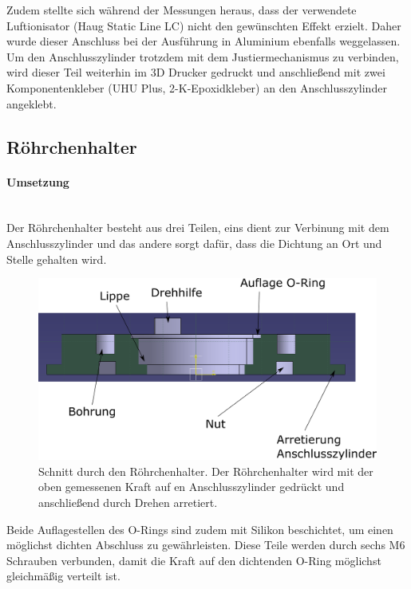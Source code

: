 Zudem stellte sich während der Messungen heraus, dass der verwendete Luftionisator (Haug Static Line LC) nicht den gewünschten Effekt erzielt. Daher wurde dieser Anschluss bei der Ausführung in Aluminium ebenfalls weggelassen. Um den Anschlusszylinder trotzdem mit dem Justiermechanismus zu verbinden, wird dieser Teil weiterhin im 3D Drucker gedruckt und anschließend mit zwei Komponentenkleber (UHU Plus, 2-K-Epoxidkleber) an den Anschlusszylinder angeklebt.

\newpage

\subsection{Röhrchenhalter}

\paragraph{Umsetzung}

\hfill \\

Der Röhrchenhalter besteht aus drei Teilen, eins dient zur Verbinung mit dem Anschlusszylinder und das andere sorgt dafür, dass die Dichtung an Ort und Stelle gehalten wird. 

\begin{figure}[h!]
	\begin{center}
		\includegraphics[scale=0.5]{Schnitt_Roehrchenhalter.png}
		\caption[Schnitt Röhrchenhalter]{Schnitt durch den Röhrchenhalter. Der Röhrchenhalter wird mit der oben gemessenen Kraft auf en Anschlusszylinder gedrückt und anschließend durch Drehen arretiert.}
	\end{center}
\end{figure}

Beide Auflagestellen des O-Rings sind zudem mit Silikon beschichtet, um einen möglichst dichten Abschluss zu gewährleisten.
Diese Teile werden durch sechs M6 Schrauben verbunden, damit die Kraft auf den dichtenden O-Ring möglichst gleichmäßig verteilt ist. \\


